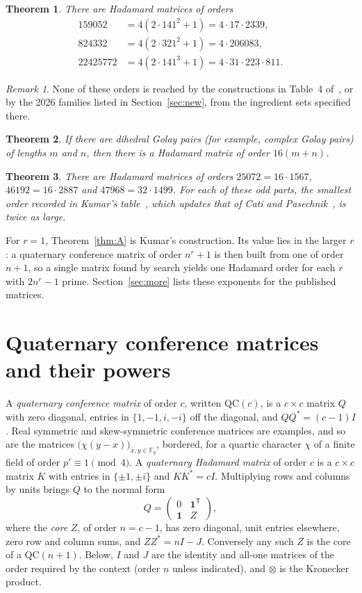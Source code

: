 \documentclass[10pt]{article}
\newtheorem{theorem}{Theorem}
\theoremstyle{remark}
\newtheorem*{remark}{Remark}
\newcommand{\tr}{^{\mathsf T}}
\newcommand{\QC}{\mathrm{QC}}
\begin{document}
\begin{theorem}\label{thm:B}
There are Hadamard matrices of orders
\[
\begin{aligned}159052&=4(2\cdot141^2+1)=4\cdot17\cdot2339,\\ 824332&=4(2\cdot321^2+1)=4\cdot206083,\\ 22425772&=4(2\cdot141^3+1)=4\cdot31\cdot223\cdot811.\end{aligned}
\]
\end{theorem}

\begin{remark}
None of these orders is reached by the constructions in Table~4 of~\cite{EKLO}, or by the 2026 families listed in Section~\ref{sec:new}, from the ingredient sets specified there.
\end{remark}

\begin{theorem}\label{thm:C}
If there are dihedral Golay pairs (for example, complex Golay pairs) of lengths $m$ and $n$, then there is a Hadamard matrix of order $16(m+n)$.
\end{theorem}

\begin{theorem}\label{thm:D}
There are Hadamard matrices of orders $25072=16\cdot1567$, $46192=16\cdot2887$ and $47968=32\cdot1499$. For each of these odd parts, the smallest order recorded in Kumar's table~\cite{Ku26}, which updates that of Cati and Pasechnik~\cite{CP24}, is twice as large.
\end{theorem}

For $r=1$, Theorem~\ref{thm:A} is Kumar's construction. Its value lies in the larger $r$: a quaternary conference matrix of order $n^r+1$ is then built from one of order $n+1$, so a single matrix found by search yields one Hadamard order for each $r$ with $2n^r-1$ prime. Section~\ref{sec:more} lists these exponents for the published matrices.

\section{Quaternary conference matrices and their powers}\label{sec:power}
A \emph{quaternary conference matrix} of order $c$, written $\QC(c)$, is a $c\times c$ matrix $Q$ with zero diagonal, entries in $\{1,-1,i,-i\}$ off the diagonal, and $QQ^*=(c-1)I$. Real symmetric and skew-symmetric conference matrices are examples, and so are the matrices $\bigl(\chi(y-x)\bigr)_{x,y\in\mathbb F_q}$, bordered, for a quartic character $\chi$ of a finite field of order $p'\equiv1\pmod4$. A \emph{quaternary Hadamard matrix} of order $c$ is a $c\times c$ matrix $K$ with entries in $\{\pm1,\pm i\}$ and $KK^*=cI$. Multiplying rows and columns by units brings $Q$ to the normal form
\[
Q=\begin{pmatrix}0&\mathbf 1\tr\\ \mathbf 1&Z\end{pmatrix},
\]
where the \emph{core} $Z$, of order $n=c-1$, has zero diagonal, unit entries elsewhere, zero row and column sums, and $ZZ^*=nI-J$. Conversely any such $Z$ is the core of a $\QC(n+1)$. Below, $I$ and $J$ are the identity and all-one matrices of the order required by the context (order $n$ unless indicated), and $\otimes$ is the Kronecker product.
\end{document}
